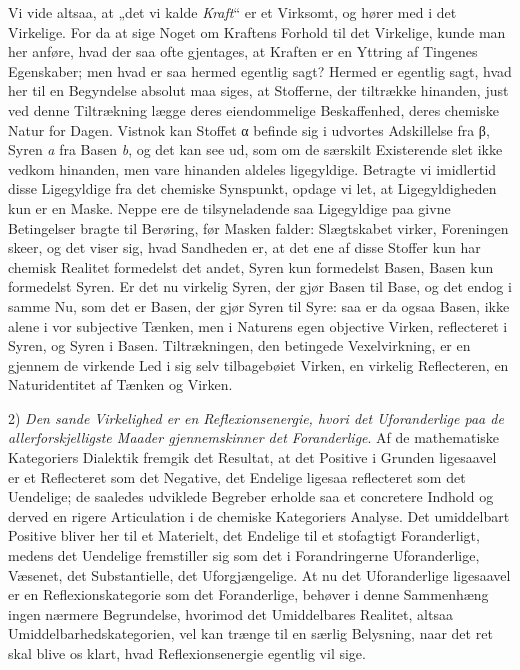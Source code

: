 \documentclass[12pt,a4paper]{book}
\begin{document}
Vi vide altsaa, at „det vi kalde \emph{Kraft}“ er et
Virksomt, og hører med i det Virkelige. For da at sige Noget
om Kraftens Forhold til det Virkelige, kunde man her
anføre, hvad der saa ofte gjentages, at Kraften er en Yttring
af Tingenes Egenskaber; men hvad er saa hermed egentlig
sagt? Hermed er egentlig sagt, hvad her til en Begyndelse
absolut maa siges, at Stofferne, der tiltrække hinanden, just
ved denne Tiltrækning lægge deres eiendommelige
Beskaffenhed, deres chemiske Natur for Dagen. Vistnok kan Stoffet
α befinde sig i udvortes Adskillelse fra β, Syren \textit{a} fra Basen
\textit{b}, og det kan see ud, som om de særskilt Existerende slet
ikke vedkom hinanden, men vare hinanden aldeles ligegyldige.
Betragte vi imidlertid disse Ligegyldige fra det chemiske
Synspunkt, opdage vi let, at Ligegyldigheden kun er en Maske.
Neppe ere de tilsyneladende saa Ligegyldige paa givne
Betingelser bragte til Berøring, før Masken falder:
Slægtskabet virker, Foreningen skeer, og det viser sig, hvad
Sandheden er, at det ene af disse Stoffer kun har chemisk
Realitet formedelst det andet, Syren kun formedelst Basen, Basen
kun formedelst Syren. Er det nu virkelig Syren, der gjør
Basen til Base, og det endog i samme Nu, som det er Basen,
der gjør Syren til Syre: saa er da ogsaa Basen, ikke alene
i vor subjective Tænken, men i Naturens egen objective
Virken, reflecteret i Syren, og Syren i Basen. Tiltrækningen,
den betingede Vexelvirkning, er en gjennem de virkende Led i
sig selv tilbagebøiet Virken, en virkelig Reflecteren, en
Naturidentitet af Tænken og Virken.

2) \emph{Den sande Virkelighed er en
Reflexionsenergie, hvori det Uforanderlige paa de
allerforskjelligste Maader gjennemskinner det
Foranderlige}. Af de mathematiske Kategoriers Dialektik
fremgik det Resultat, at det Positive i Grunden ligesaavel er et
Reflecteret som det Negative, det Endelige ligesaa reflecteret
som det Uendelige; de saaledes udviklede Begreber erholde
saa et concretere Indhold og derved en rigere Articulation i
de chemiske Kategoriers Analyse. Det umiddelbart Positive
bliver her til et Materielt, det Endelige til et stofagtigt
Foranderligt, medens det Uendelige fremstiller sig som det i
Forandringerne Uforanderlige, Væsenet, det Substantielle, det
Uforgjængelige. At nu det Uforanderlige ligesaavel er en
Reflexionskategorie som det Foranderlige, behøver i denne
Sammenhæng ingen nærmere Begrundelse, hvorimod det
Umiddelbares Realitet, altsaa Umiddelbarhedskategorien, vel
kan trænge til en særlig Belysning, naar det ret skal blive
os klart, hvad Reflexionsenergie egentlig vil sige.
\end{document}

